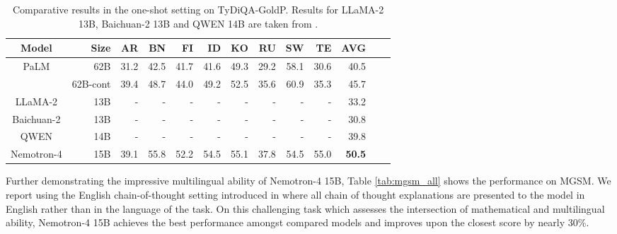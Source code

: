 \documentclass[11pt]{article}
\newcommand{\ours}{Nemotron-4}
\begin{document}
\begin{table}[H]
\centering
\begin{adjustbox}{max width=\textwidth, scale=1.0}
\begin{tabular}{crrrrrrrrrrrr}
\toprule
Model & Size & AR & BN & FI & ID & KO & RU & SW & TE & AVG  \\
\midrule
\multirow{2}{*}{PaLM}& 62B & 31.2 & 42.5 & 41.7 & 41.6	& 49.3 & 29.2 &	58.1 & 30.6 &	40.5    \\
 & 62B-cont & 39.4	& 48.7 & 44.0 &	49.2	&52.5&	35.6 &	60.9&	35.3	& 45.7    \\
 LLaMA-2 & 13B & -& -& -& -& -& -& -& -& 33.2 \\
 Baichuan-2 & 13B & -& -& -& -& -& -& -& -& 30.8\\
 QWEN & 14B & -& -& -& -& -& -& -& -& 39.8 \\
\ours{} & 15B & 39.1 & 55.8 &52.2 & 54.5 & 55.1 & 37.8 & 54.5 & 55.0 & \textbf{50.5} \\
\bottomrule
\end{tabular}
\end{adjustbox}
\caption{\label{tab:tydiqa_internal} Comparative results in the one-shot setting on TyDiQA-GoldP. Results for LLaMA-2 13B, Baichuan-2 13B and QWEN 14B are taken from \citep{chen2024orion14b}.  }
\end{table}

Further demonstrating the impressive multilingual ability of \ours{} 15B, Table \ref{tab:mgsm_all} shows the performance on MGSM. 
We report using the English chain-of-thought setting introduced in \citep{shi2022language} where all chain of thought explanations are presented to the model in English rather than in the language of the task. On this challenging task which assesses the intersection of mathematical and multilingual ability, \ours{} 15B achieves the best performance amongst compared models and improves upon the closest score by nearly 30\%.
\end{document}
